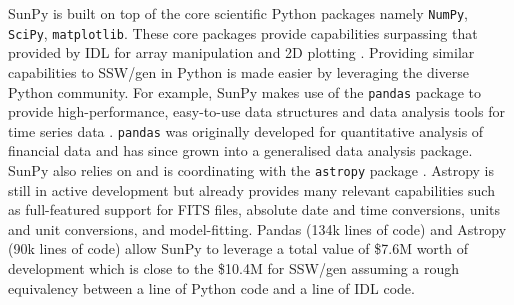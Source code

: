 SunPy is built on top of the core scientific Python packages namely 
\texttt{NumPy}, \texttt{SciPy}, \texttt{matplotlib}. These core packages 
provide capabilities surpassing that provided by IDL for array manipulation and 
2D plotting \citep{greenfield2011}. Providing similar capabilities to SSW/gen 
in Python is made easier by leveraging the diverse Python community. For 
example, SunPy makes use of the \texttt{pandas} package to provide 
high-performance, easy-to-use data structures and data analysis tools for time 
series data \citep{mckinney2012}. \texttt{pandas} was originally developed for 
quantitative analysis of financial data and has since grown into a generalised 
data analysis package. SunPy also relies on and is coordinating with the 
\texttt{astropy} package \citep{theastropycollaboration2013}. Astropy is still in 
active development but already provides many relevant capabilities such as 
full-featured support for FITS files, absolute date and time conversions, 
units and unit conversions, and model-fitting. Pandas (134k lines of code) 
and Astropy (90k lines of code) allow SunPy to leverage a total value of \$7.6M 
worth of development which is close to the \$10.4M for SSW/gen assuming a rough 
equivalency between a line of Python code and a line of IDL code. 
